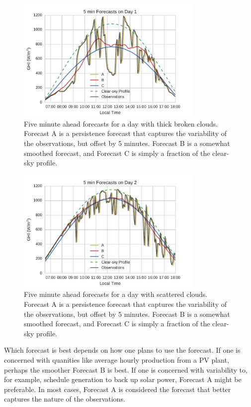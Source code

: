 \begin{figure}[tbp]
\centering
\includegraphics[width=0.8\textwidth]{figs/error_fx_Day_1.pdf}
\caption[Forecasts for a day with thick, broken clouds]{Five minute
  ahead forecasts for a day with thick broken clouds. Forecast A is a
  persistence forecast that captures the variability of the
  observations, but offset by 5 minutes. Forecast B is a somewhat
  smoothed forecast, and Forecast C is simply a fraction of the
  clear-sky profile.}
\label{fig:5minfx_day1}
\end{figure}

\begin{figure}[tbp]
\centering
\includegraphics[width=0.8\textwidth]{figs/error_fx_Day_2.pdf}
\caption[Forecasts for a day with scattered clouds]{Five minute
  ahead forecasts for a day with scattered clouds. Forecast A is a
  persistence forecast that captures the variability of the
  observations, but offset by 5 minutes. Forecast B is a somewhat
  smoothed forecast, and Forecast C is simply a fraction of the
  clear-sky profile.}
\label{fig:5minfx_day2}
\end{figure}

Which forecast is best depends on how one plans to use the forecast.
If one is concerned with quanities like average hourly production from
a PV plant, perhaps the smoother Forecast B is best.
If one is concerned with variability to, for example, schedule
generation to back up solar power, Forecast A might be preferable.
In most cases, Forecast A is considered the forecast that better
captures the nature of the observations.

